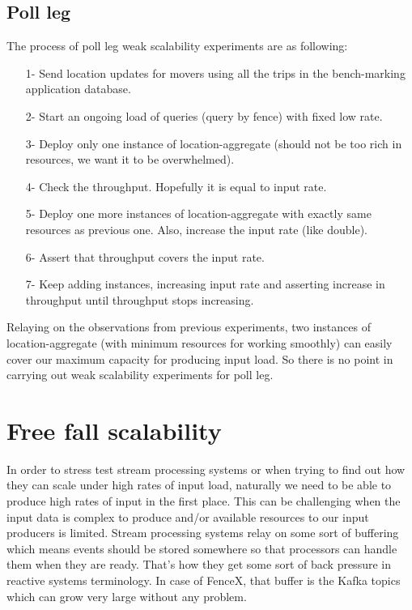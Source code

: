 \documentclass[a4]{report}
\begin{document}
    \subsection{Poll leg}
    The process of poll leg weak scalability experiments are as following:
    \begin{itemize}
        \item[1-] Send location updates for movers using all the trips in the bench-marking application database.
        \item[2-] Start an ongoing load of queries (query by fence) with fixed low rate.
        \item[3-] Deploy only one instance of location-aggregate (should not be too rich in resources, we want it to
        be overwhelmed).
        \item[4-] Check the throughput. Hopefully it is equal to input rate.
        \item[5-] Deploy one more instances of location-aggregate with exactly same resources as previous one. Also,
        increase the input rate (like double).
        \item[6-] Assert that throughput covers the input rate.
        \item[7-] Keep adding instances, increasing input rate and asserting increase in throughput until throughput
        stops increasing.
    \end{itemize}

    Relaying on the observations from previous experiments, two instances of location-aggregate (with minimum
    resources for working smoothly) can easily cover our maximum capacity for producing input load.
    So there is no point in carrying out weak scalability experiments for poll leg.


    \section{Free fall scalability}
    In order to stress test stream processing systems or when trying to find out how they can scale under high rates
    of input load, naturally we need to be able to produce high rates of input in the first place.
    This can be challenging when the input data is complex to produce and/or available resources to our input
    producers is limited.
    Stream processing systems relay on some sort of buffering which means events should be stored somewhere so
    that processors can handle them when they are ready.
    That's how they get some sort of back pressure in reactive systems terminology.
    In case of FenceX, that buffer is the Kafka topics which can grow very large without any problem.
\end{document}
